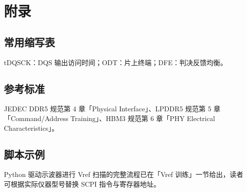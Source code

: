\chapter{附录}
\section{常用缩写表}
tDQSCK：DQS 输出访问时间；ODT：片上终端；DFE：判决反馈均衡。\par
\section{参考标准}
JEDEC DDR5 规范第 4 章「Physical Interface」、LPDDR5 规范第 5 章「Command/Address Training」、HBM3 规范第 6 章「PHY Electrical Characteristics」。\par
\section{脚本示例}
Python 驱动示波器进行 Vref 扫描的完整流程已在「Vref 训练」一节给出，读者可根据实际仪器型号替换 SCPI 指令与寄存器地址。\par

